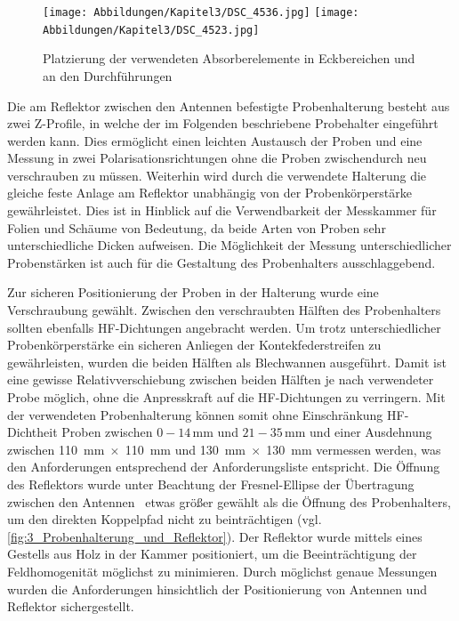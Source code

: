 \begin{figure}
    \centering
    \texttt{[image: Abbildungen/Kapitel3/DSC\_4536.jpg]}
    \hspace{.5cm}
    \texttt{[image: Abbildungen/Kapitel3/DSC\_4523.jpg]}
    \caption{Platzierung der verwendeten Absorberelemente in Eckbereichen und an den Durchführungen}
    \label{fig:3_Absorberplatzierung}
\end{figure}



    

Die am Reflektor zwischen den Antennen befestigte Probenhalterung besteht aus zwei Z-Profile, in welche der im Folgenden beschriebene Probehalter eingeführt werden kann. Dies ermöglicht einen leichten Austausch der Proben und eine Messung in zwei Polarisationsrichtungen ohne die Proben zwischendurch neu verschrauben zu müssen. Weiterhin wird durch die verwendete Halterung die gleiche feste Anlage am Reflektor unabhängig von der Probenkörperstärke gewährleistet. Dies ist in Hinblick auf die Verwendbarkeit der Messkammer für Folien und Schäume von Bedeutung, da beide Arten von Proben sehr unterschiedliche Dicken aufweisen. Die Möglichkeit der Messung unterschiedlicher Probenstärken ist auch für die Gestaltung des Probenhalters ausschlaggebend.
\par
\vspace{\linespace}
Zur sicheren Positionierung der Proben in der Halterung wurde eine Verschraubung gewählt. Zwischen den verschraubten Hälften des Probenhalters sollten ebenfalls HF-Dichtungen angebracht werden. Um trotz unterschiedlicher Probenkörperstärke ein sicheren Anliegen der Kontekfederstreifen zu gewährleisten, wurden die beiden Hälften als Blechwannen ausgeführt. Damit ist eine gewisse Relativverschiebung zwischen beiden Hälften je nach verwendeter Probe möglich, ohne die Anpresskraft auf die HF-Dichtungen zu verringern. Mit der verwendeten Probenhalterung können somit ohne Einschränkung HF-Dichtheit Proben zwischen $0-14\,\si{\milli\meter}$ und $21-35\,\si{\milli\meter}$ und einer Ausdehnung zwischen \SI{110}{\milli\meter}$\; \times \;$\SI{110}{\milli\meter} und \SI{130}{\milli\meter}$\; \times \;$\SI{130}{\milli\meter} vermessen werden, was den Anforderungen entsprechend der Anforderungsliste entspricht. Die Öffnung des Reflektors wurde unter Beachtung der Fresnel-Ellipse der Übertragung zwischen den Antennen~\cite{Taschenbuch_HF-Technik} etwas größer gewählt als die Öffnung des Probenhalters, um den direkten Koppelpfad nicht zu beinträchtigen (vgl. \Abb\ref{fig:3_Probenhalterung_und_Reflektor}). Der Reflektor wurde mittels eines Gestells aus Holz in der Kammer positioniert, um die Beeinträchtigung der Feldhomogenität möglichst zu minimieren. Durch möglichst genaue Messungen wurden die Anforderungen hinsichtlich der Positionierung von Antennen und Reflektor sichergestellt.
\par
\vspace{\linespace}

